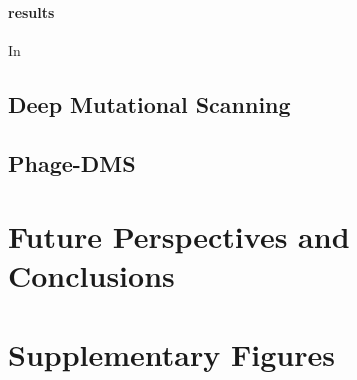 \documentclass{article}
\newcommand{\beginsupplement}{%
        \setcounter{table}{0}
        \renewcommand{\thetable}{S\arabic{table}}%
        \setcounter{figure}{0}
        \renewcommand{\thefigure}{S\arabic{figure}}%
     }
\begin{document}
\paragraph{results}

In 


\subsection*{Deep Mutational Scanning}

\paragraph*{}

\subsection*{Phage-DMS}

\section*{Future Perspectives and Conclusions}




% 
% 




\section*{Supplementary Figures}

\end{document}
